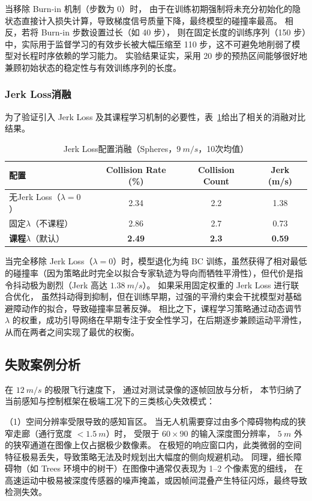 当移除 Burn-in 机制（步数为 0）时，
由于在训练初期强制将未充分初始化的隐状态直接计入损失计算，导致梯度信号质量下降，最终模型的碰撞率最高。
相反，若将 Burn-in 步数设置过长（如 40 步），
则在固定长度的训练序列（150 步）中，实际用于监督学习的有效步长被大幅压缩至 110 步，这不可避免地削弱了模型对长程时序依赖的学习能力。
实验结果证实，采用 20 步的预热区间能够很好地兼顾初始状态的稳定性与有效训练序列的长度。

\subsubsection{Jerk Loss消融}

为了验证引入 Jerk Loss 及其课程学习机制的必要性，表~\ref{tab:ablation_jerk}给出了相关的消融对比结果。

\begin{table}[htbp]
\centering
\caption{Jerk Loss配置消融（Spheres，$\SI{9}{m/s}$，10次均值）}
\label{tab:ablation_jerk}
\begin{tabular}{lccc}
\toprule
\textbf{配置} & \textbf{Collision Rate (\%)} & \textbf{Collision Count} & \textbf{Jerk (m/s)} \\
\midrule
无Jerk Loss（$\lambda=0$） & 2.34 & 2.2 & 1.38 \\
固定$\lambda$（不课程） & 2.86 & 2.7 & 0.73 \\
\textbf{课程$\lambda$}（默认） & \textbf{2.49} & \textbf{2.3} & \textbf{0.59} \\
\bottomrule
\end{tabular}
\end{table}

当完全移除 Jerk Loss（$\lambda=0$）时，模型退化为纯 BC 训练，虽然获得了相对最低的碰撞率（因为策略此时完全以拟合专家轨迹为导向而牺牲平滑性），但代价是指令抖动极为剧烈（Jerk 高达 $\SI{1.38}{m/s}$）。
如果采用固定权重的 Jerk Loss 进行联合优化，
虽然抖动得到抑制，但在训练早期，过强的平滑约束会干扰模型对基础避障动作的拟合，导致碰撞率显著反弹。
相比之下，课程学习策略通过动态调节 $\lambda$ 的权重，成功引导网络在早期专注于安全性学习，在后期逐步兼顾运动平滑性，从而在两者之间实现了最优的权衡。

\subsection{失败案例分析}

在 $\SI{12}{m/s}$ 的极限飞行速度下，
通过对测试录像的逐帧回放与分析，
本节归纳了当前感知与控制框架在极端工况下的三类核心失效模式：

（1）空间分辨率受限导致的感知盲区。
当无人机需要穿过由多个障碍物构成的狭窄走廊（通行宽度 $<\SI{1.5}{m}$）时，
受限于 $60 \times 90$ 的输入深度图分辨率，
$\SI{5}{m}$ 外的狭窄通道在图像上仅占据极少数像素。
在极短的响应窗口内，此类微弱的空间特征极易丢失，导致策略无法及时规划出大幅度的侧向规避机动。
同理，细长障碍物（如 Trees 环境中的树干）在图像中通常仅表现为 1--2 个像素宽的细线，
在高速运动中极易被深度传感器的噪声掩盖，或因帧间混叠产生特征闪烁，最终导致检测失效。

